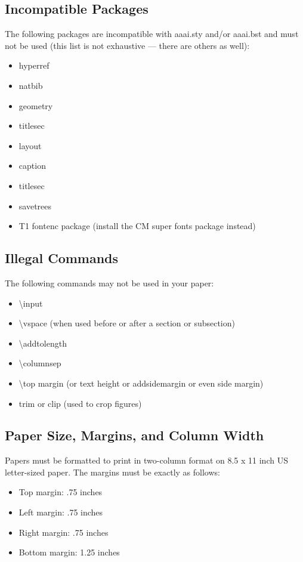 \documentclass[letterpaper]{article}
\begin{document}
\subsection{Incompatible Packages}
The following packages are incompatible with aaai.sty and/or aaai.bst and must not be used (this list is not exhaustive --- there are others as well):
\begin{itemize}
\item hyperref
\item natbib
\item geometry
\item titlesec
\item layout
\item caption
\item titlesec
\item savetrees
\item T1 fontenc package (install the CM super fonts package instead)
\end{itemize}

\subsection{Illegal Commands}
The following commands may not be used in your paper:
\begin{itemize}
\item \textbackslash input
\item \textbackslash vspace (when used before or after a section or subsection)
\item \textbackslash addtolength 
\item \textbackslash columnsep
\item \textbackslash top margin (or text height or addsidemargin or even side margin)
\item trim or clip (used to crop figures)
\end{itemize}

\subsection{Paper Size, Margins, and Column Width}
Papers must be formatted to print in two-column format on 8.5 x 11 inch US letter-sized paper. The margins must be exactly as follows: 
\begin{itemize}
\item Top margin: .75 inches
\item Left margin: .75 inches
\item Right margin: .75 inches
\item Bottom margin: 1.25 inches
\end{itemize} 
\end{document}
